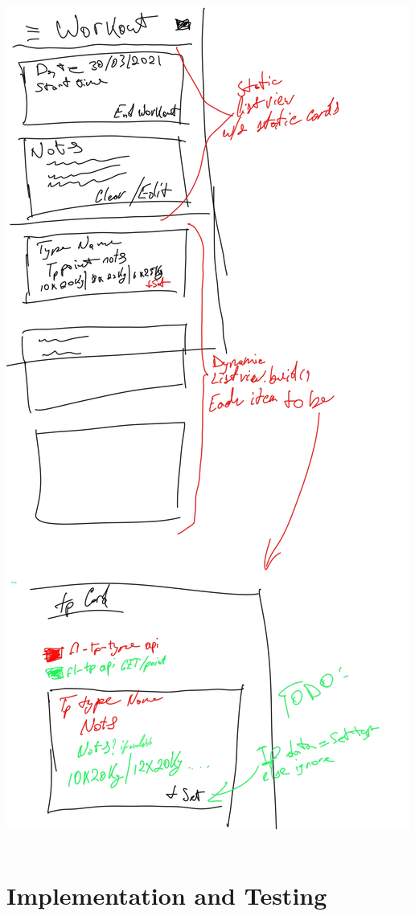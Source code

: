\documentclass{article}
\newcommand{\vspaceconst}{-2ex}
\begin{document}
\begin{multicols}{2}
\includegraphics[width=0.9\linewidth]{./appendix/assets/img/uiDesigns/workoutsPage.jpg}
~\label{fig:uiWorkoutPageDesign}
\endgroup


\section{Implementation and Testing}
\vspace{\vspaceconst}


\end{multicols}
\end{document}
